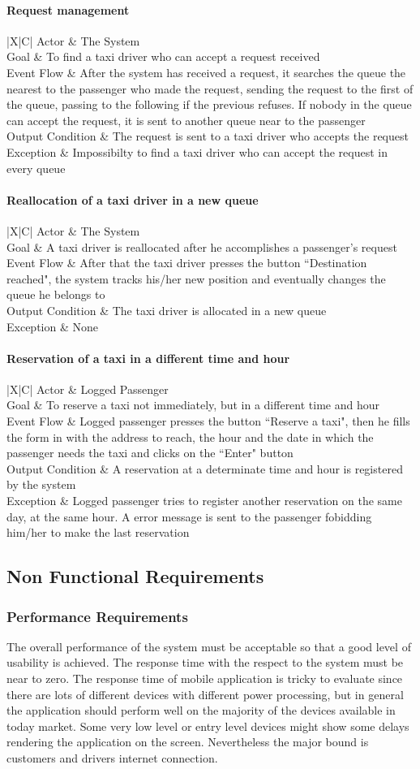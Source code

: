 \documentclass[a4paper,12pt]{article}%
\newcommand{\usecasetable}[5]{
\begin{center}
\begin{tabularx}{\textwidth}{|X|C|}
\hline
Actor & #1\\
\hline
Goal & #2\\
\hline
Event Flow & #3\\
\hline
Output Condition & #4\\
\hline
Exception & #5\\
\hline
\end{tabularx}
\end{center}
}
\begin{document}
\paragraph{Request management}
\usecasetable {The System}{To find a taxi driver who can accept a request received}{After the system has received a request, it searches the queue the nearest to the passenger who made the request, sending the request to the first of the queue, passing to the following if the previous refuses. If nobody in the queue can accept the request, it is sent to another queue near to the passenger}{The request is sent to a taxi driver who accepts the request}{Impossibilty to find a taxi driver who can accept the request in every queue}
\paragraph{Reallocation of a taxi driver in a new queue}
\usecasetable {The System}{A taxi driver is reallocated after he accomplishes a passenger's request}{After that the taxi driver presses the button ``Destination reached", the system tracks his/her new position and eventually changes the queue he belongs to}{The taxi driver is allocated in a new queue}{None}
\paragraph{Reservation of a taxi in a different time and hour}
\usecasetable {Logged Passenger}{To reserve a taxi not immediately, but in a different time and hour}{Logged passenger presses the button ``Reserve a taxi", then he fills the form in with the address to reach, the hour and the date in which the passenger needs the taxi and clicks on the ``Enter" button}{A reservation at a determinate time and hour is registered by the system}{Logged passenger tries to register another reservation on the same day, at the same hour. A error message is sent to the passenger fobidding him/her to make the last reservation}

\pagebreak
\subsection{Non Functional Requirements}
\subsubsection{Performance Requirements}
The overall performance of the system must be acceptable so that a good level of usability is achieved.
The response time with the respect to the system must be near to zero. The response time of mobile application is tricky to evaluate since there are lots of different devices with different power processing, but  in general the application should perform well on the majority of the devices available in today market. Some very low level or entry level devices might show some delays rendering the application on the screen. Nevertheless the major bound is customers and drivers internet connection. 
\end{document}
